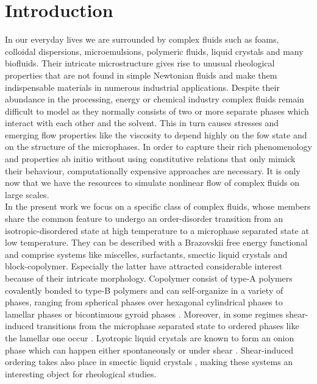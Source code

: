 \documentclass[8.5pt,twoside,twocolumn]{article}
\begin{document}
\section{Introduction}
In our everyday lives we are surrounded by complex fluids such as foams, colloidal dispersions, microemulsions, polymeric fluids, liquid crystals and many biofluids.
Their intricate microstructure gives rise to unusual rheological properties that are not found in simple Newtonian fluids and make them indispensable materials in numerous industrial applications.
Despite their abundance in the processing, energy or chemical industry complex fluids remain difficult to model as they normally consists of two or more separate phases which interact with each other and the solvent.
This in turn causes stresses and emerging flow properties like the viscosity to depend highly on the fow state and on the structure of the microphases. 
In order to capture their rich phenomenology and properties ab initio without using constitutive relations that only mimick their behaviour, computationally expensive approaches are necessary.
It is only now that we have the resources to simulate nonlinear flow of complex fluids on large scales\cite{Saksena09}.\\
In the present work we focus on a specific class of complex fluids, whose members share the common feature to undergo an order-disorder transition from an isotropic-disordered state at high temperature to a microphase separated state at low temperature.
They can be described with a Brazovskii free energy functional \cite{Brazovskii75} and comprise systems like miscelles, surfactants, smectic liquid crystals and block-copolymer.
Especially the latter have attracted considerable interest because of their intricate morphology.
Copolymer consist of type-A polymers covalently bonded to type-B polymers and can self-organize in a variety of phases, ranging from spherical phases over hexagonal cylindrical phases to lamellar phases or bicontinuous gyroid phases \cite{Bates90}. 
Moreover, in some regimes shear-induced transitions from the microphase separated state to ordered phases like the lamellar one occur \cite{Cates89,Koppi93,Fredrickson94}.
Lyotropic liquid crystals are known to form an onion phase \cite{Panizza96,Iwashita07} which can happen either spontaneously \cite{Gomati87,Boltenhagen92,Fournier94,Ramos04} or under shear \cite{Diat93}.
Shear-induced ordering takes also place in smectic liquid crystals \cite{Larson93,Hamley99}, making these systems an interesting object for rheological studies.\\
\end{document}
